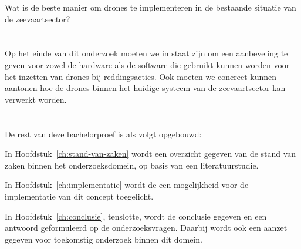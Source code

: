 Wat is de beste manier om drones te implementeren in de bestaande situatie van de zeevaartsector?

\section{}
\label{sec:onderzoeksdoelstelling}

Op het einde van dit onderzoek moeten we in staat zijn om een aanbeveling te geven voor zowel de hardware als de software die gebruikt kunnen worden voor het inzetten van drones bij reddingsacties. Ook moeten we concreet kunnen aantonen hoe de drones binnen het huidige systeem van de zeevaartsector kan verwerkt worden.

\section{}
\label{sec:opzet-bachelorproef}


De rest van deze bachelorproef is als volgt opgebouwd:

In Hoofdstuk~\ref{ch:stand-van-zaken} wordt een overzicht gegeven van de stand van zaken binnen het onderzoeksdomein, op basis van een literatuurstudie.

In Hoofdstuk~\ref{ch:implementatie} wordt de een mogelijkheid voor de implementatie van dit concept toegelicht.


In Hoofdstuk~\ref{ch:conclusie}, tenslotte, wordt de conclusie gegeven en een antwoord geformuleerd op de onderzoeksvragen. Daarbij wordt ook een aanzet gegeven voor toekomstig onderzoek binnen dit domein.